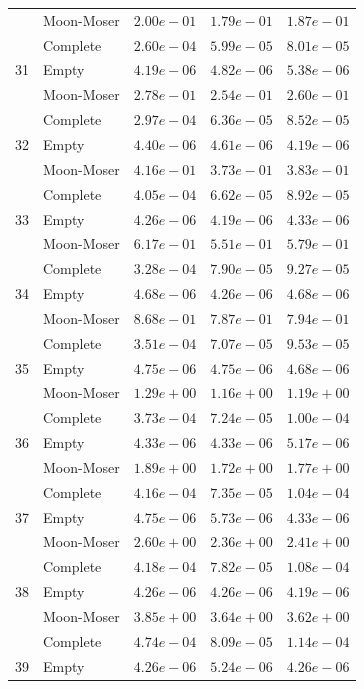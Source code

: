 \documentclass[12pt,a4paper]{article}
\begin{document}
\begin{longtable}{|l||l|l|l|l|}
  & Moon-Moser & $2.00e-01$ & $1.79e-01$ & $1.87e-01$ \\
  & Complete & $2.60e-04$ & $5.99e-05$ & $8.01e-05$ \\
  \hline
  31 & Empty & $4.19e-06$ & $4.82e-06$ & $5.38e-06$ \\
  & Moon-Moser & $2.78e-01$ & $2.54e-01$ & $2.60e-01$ \\
  & Complete & $2.97e-04$ & $6.36e-05$ & $8.52e-05$ \\
  \hline
  32 & Empty & $4.40e-06$ & $4.61e-06$ & $4.19e-06$ \\
  & Moon-Moser & $4.16e-01$ & $3.73e-01$ & $3.83e-01$ \\
  & Complete & $4.05e-04$ & $6.62e-05$ & $8.92e-05$ \\
  \hline
  33 & Empty & $4.26e-06$ & $4.19e-06$ & $4.33e-06$ \\
  & Moon-Moser & $6.17e-01$ & $5.51e-01$ & $5.79e-01$ \\
  & Complete & $3.28e-04$ & $7.90e-05$ & $9.27e-05$ \\
  \hline
  34 & Empty & $4.68e-06$ & $4.26e-06$ & $4.68e-06$ \\
  & Moon-Moser & $8.68e-01$ & $7.87e-01$ & $7.94e-01$ \\
  & Complete & $3.51e-04$ & $7.07e-05$ & $9.53e-05$ \\
  \hline
  35 & Empty & $4.75e-06$ & $4.75e-06$ & $4.68e-06$ \\
  & Moon-Moser & $1.29e+00$ & $1.16e+00$ & $1.19e+00$ \\
  & Complete & $3.73e-04$ & $7.24e-05$ & $1.00e-04$ \\
  \hline
  36 & Empty & $4.33e-06$ & $4.33e-06$ & $5.17e-06$ \\
  & Moon-Moser & $1.89e+00$ & $1.72e+00$ & $1.77e+00$ \\
  & Complete & $4.16e-04$ & $7.35e-05$ & $1.04e-04$ \\
  \hline
  37 & Empty & $4.75e-06$ & $5.73e-06$ & $4.33e-06$ \\
  & Moon-Moser & $2.60e+00$ & $2.36e+00$ & $2.41e+00$ \\
  & Complete & $4.18e-04$ & $7.82e-05$ & $1.08e-04$ \\
  \hline
  38 & Empty & $4.26e-06$ & $4.26e-06$ & $4.19e-06$ \\
  & Moon-Moser & $3.85e+00$ & $3.64e+00$ & $3.62e+00$ \\
  & Complete & $4.74e-04$ & $8.09e-05$ & $1.14e-04$ \\
  \hline
  39 & Empty & $4.26e-06$ & $5.24e-06$ & $4.26e-06$ \\

\end{longtable}
\end{document}
